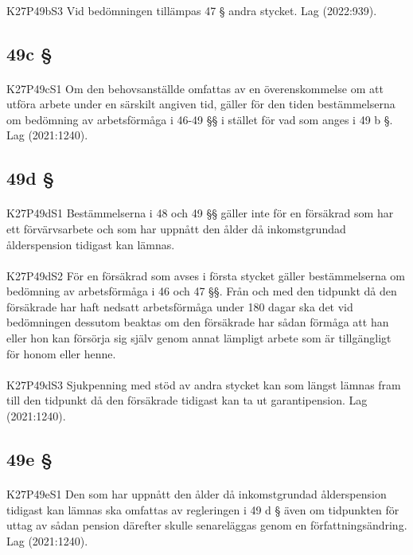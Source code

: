 \documentclass[a4paper,notitlepage,openany,10pt]{book}
\begin{document}
\paragraph*{}
{\tiny K27P49bS3}
Vid bedömningen tillämpas 47 § andra stycket.
Lag (2022:939).
\subsection*{49c §}
\paragraph*{}
{\tiny K27P49cS1}
Om den behovsanställde omfattas av en överenskommelse om att utföra arbete under en särskilt angiven tid, gäller för den tiden bestämmelserna om bedömning av arbetsförmåga i 46-49 §§ i stället för vad som anges i 49 b §.
Lag (2021:1240).
\subsection*{49d §}
\paragraph*{}
{\tiny K27P49dS1}
Bestämmelserna i 48 och 49 §§ gäller inte för en försäkrad som har ett förvärvsarbete och som har uppnått den ålder då inkomstgrundad ålderspension tidigast kan lämnas.
\paragraph*{}
{\tiny K27P49dS2}
För en försäkrad som avses i första stycket gäller bestämmelserna om bedömning av arbetsförmåga i 46 och 47 §§. Från och med den tidpunkt då den försäkrade har haft nedsatt arbetsförmåga under 180 dagar ska det vid bedömningen dessutom beaktas om den försäkrade har sådan förmåga att han eller hon kan försörja sig själv genom annat lämpligt arbete som är tillgängligt för honom eller henne.
\paragraph*{}
{\tiny K27P49dS3}
Sjukpenning med stöd av andra stycket kan som längst lämnas fram till den tidpunkt då den försäkrade tidigast kan ta ut garantipension.
Lag (2021:1240).
\subsection*{49e §}
\paragraph*{}
{\tiny K27P49eS1}
Den som har uppnått den ålder då inkomstgrundad ålderspension tidigast kan lämnas ska omfattas av regleringen i 49 d § även om tidpunkten för uttag av sådan pension därefter skulle senareläggas genom en författningsändring.
Lag (2021:1240).
\end{document}
